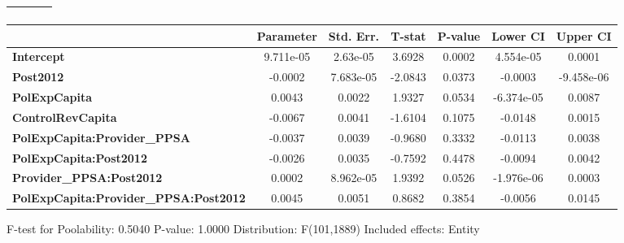 \begin{center}
\begin{tabular}{lclc}
\textbf{}                                     &                    & \textbf{                     }   &                  \\
\bottomrule
\end{tabular}
\begin{tabular}{lcccccc}
                                              & \textbf{Parameter} & \textbf{Std. Err.} & \textbf{T-stat} & \textbf{P-value} & \textbf{Lower CI} & \textbf{Upper CI}  \\
\midrule
\textbf{Intercept}                            &     9.711e-05      &      2.63e-05      &      3.6928     &      0.0002      &     4.554e-05     &       0.0001       \\
\textbf{Post2012}                             &      -0.0002       &     7.683e-05      &     -2.0843     &      0.0373      &      -0.0003      &     -9.458e-06     \\
\textbf{PolExpCapita}                         &       0.0043       &       0.0022       &      1.9327     &      0.0534      &     -6.374e-05    &       0.0087       \\
\textbf{ControlRevCapita}                     &      -0.0067       &       0.0041       &     -1.6104     &      0.1075      &      -0.0148      &       0.0015       \\
\textbf{PolExpCapita:Provider\_PPSA}          &      -0.0037       &       0.0039       &     -0.9680     &      0.3332      &      -0.0113      &       0.0038       \\
\textbf{PolExpCapita:Post2012}                &      -0.0026       &       0.0035       &     -0.7592     &      0.4478      &      -0.0094      &       0.0042       \\
\textbf{Provider\_PPSA:Post2012}              &       0.0002       &     8.962e-05      &      1.9392     &      0.0526      &     -1.976e-06    &       0.0003       \\
\textbf{PolExpCapita:Provider\_PPSA:Post2012} &       0.0045       &       0.0051       &      0.8682     &      0.3854      &      -0.0056      &       0.0145       \\
\bottomrule
\end{tabular}
\end{center}

F-test for Poolability: 0.5040 \newline
 P-value: 1.0000 \newline
 Distribution: F(101,1889) \newline
  \newline
 Included effects: Entity